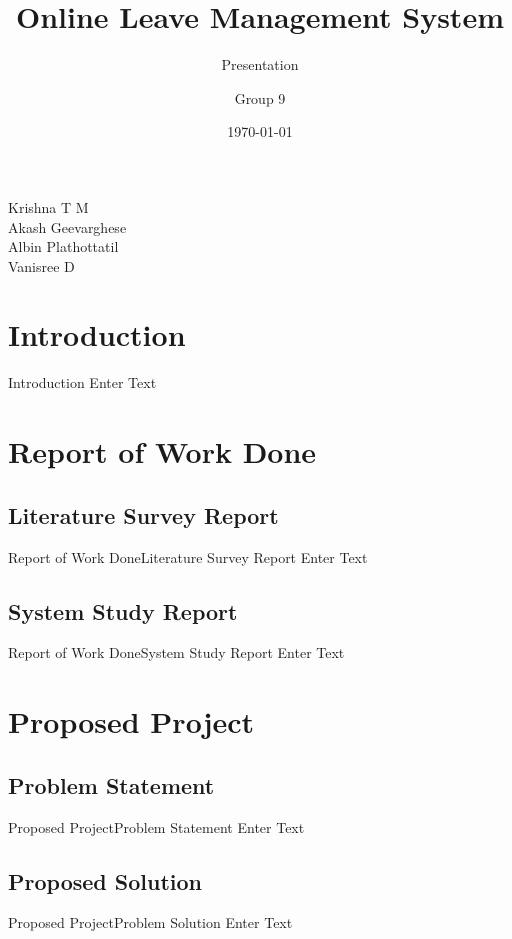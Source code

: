 \documentclass[default]{beamer}
\title[OLM]{Online Leave Management System}
\subtitle{Presentation}
\date{\today}
\author[Group 9]{Group 9}
\institute[MEC]{Govt. Model Engineering College,Thrikakkara}
\begin{document}
		
	\begin{frame}		
		\titlepage
		\begin{flushright}
		\small{Krishna T M\\Akash Geevarghese\\Albin Plathottatil\\Vanisree D}
		\end{flushright}
	\end{frame}
	
	\section{Introduction}
		\begin{frame}{Introduction}
		Enter Text 
		\end{frame}			
	
	
	\section{Report of Work Done}
		\subsection{Literature Survey Report}				
		\begin{frame}{Report of Work Done}{Literature Survey Report}
		Enter Text
		\end{frame}
		
		\subsection{System Study Report}			
		\begin{frame}{Report of Work Done}{System Study Report}
		Enter Text
		\end{frame}
	
	\section{Proposed Project}
	\subsection{Problem Statement}				
		\begin{frame}{Proposed Project}{Problem Statement}
		Enter Text
		\end{frame}
		
	\subsection{Proposed Solution}						
		\begin{frame}{Proposed Project}{Problem Solution}
		Enter Text
		\end{frame}
		
\end{document}
